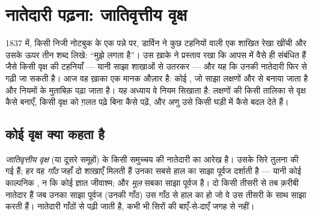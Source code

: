 \chapter{नातेदारी पढ़ना: जातिवृत्तीय वृक्ष}\label{ch:g12:phylogenetic-trees}

1837 में, किसी निजी नोटबुक के एक पन्ने पर, डार्विन ने कुछ टहनियों वाली एक
शाखित रेखा खींची और उसके ऊपर तीन शब्द लिखे: ``मुझे लगता है''। उस ख़ाके ने
प्रस्ताव रखा कि  आपस में वैसे ही संबंधित हैं जैसे किसी वृक्ष की
टहनियाँ --- यानी साझा शाखाओं से उतरकर --- और यह कि उनकी नातेदारी फिर से
गढ़ी जा सकती है। आज वह ख़ाका एक मानक औज़ार है: कोई , जो
साझा लक्षणों और  से बनाया जाता है और नियमों के मुताबिक़ पढ़ा जाता है। यह
अध्याय वे नियम सिखाता है: लक्षणों की किसी तालिका से वृक्ष कैसे बनाएँ, किसी
वृक्ष को ग़लत पढ़े बिना कैसे पढ़ें, और अणु उसे किसी घड़ी में कैसे बदल देते
हैं।

\section{कोई वृक्ष क्या कहता है}

\begin{definition}[जातिवृत्तीय वृक्ष]\label{def:g12:phylogenetic-trees:tree}
\emph{जातिवृत्तीय वृक्ष}  (या दूसरे समूहों)
के किसी समुच्चय की नातेदारी का आरेख है। उसके सिरे तुलना की गई  हैं;
हर वह \emph{गाँठ} जहाँ दो शाखाएँ मिलती हैं उनका सबसे हाल का साझा पूर्वज
दर्शाती है --- यानी कोई काल्पनिक , न कि कोई ज्ञात जीवाश्म; और
\emph{मूल} सबका साझा पूर्वज है। दो  किसी तीसरी से तब क़रीबी नातेदार
हैं जब उनका साझा पूर्वज (उनकी गाँठ) उस गाँठ से हाल का हो जो वे उस तीसरी के
साथ साझा करती हैं। नातेदारी गाँठों से पढ़ी जाती है, कभी भी सिरों की
बाएँ-से-दाएँ जगह से नहीं।
\end{definition}

